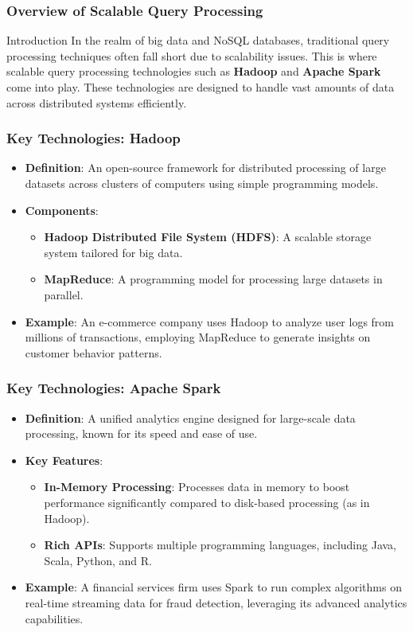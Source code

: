 \documentclass[aspectratio=169]{beamer}
\begin{document}
\begin{frame}[fragile]
    \frametitle{Overview of Scalable Query Processing}
    \begin{block}{Introduction}
        In the realm of big data and NoSQL databases, traditional query processing techniques often fall short due to scalability issues. This is where scalable query processing technologies such as \textbf{Hadoop} and \textbf{Apache Spark} come into play. These technologies are designed to handle vast amounts of data across distributed systems efficiently.
    \end{block}
\end{frame}

\begin{frame}[fragile]
    \frametitle{Key Technologies: Hadoop}
    \begin{itemize}
        \item \textbf{Definition}: An open-source framework for distributed processing of large datasets across clusters of computers using simple programming models.
        \item \textbf{Components}:
        \begin{itemize}
            \item \textbf{Hadoop Distributed File System (HDFS)}: A scalable storage system tailored for big data.
            \item \textbf{MapReduce}: A programming model for processing large datasets in parallel.
        \end{itemize}
        \item \textbf{Example}: An e-commerce company uses Hadoop to analyze user logs from millions of transactions, employing MapReduce to generate insights on customer behavior patterns.
    \end{itemize}
\end{frame}

\begin{frame}[fragile]
    \frametitle{Key Technologies: Apache Spark}
    \begin{itemize}
        \item \textbf{Definition}: A unified analytics engine designed for large-scale data processing, known for its speed and ease of use.
        \item \textbf{Key Features}:
        \begin{itemize}
            \item \textbf{In-Memory Processing}: Processes data in memory to boost performance significantly compared to disk-based processing (as in Hadoop).
            \item \textbf{Rich APIs}: Supports multiple programming languages, including Java, Scala, Python, and R.
        \end{itemize}
        \item \textbf{Example}: A financial services firm uses Spark to run complex algorithms on real-time streaming data for fraud detection, leveraging its advanced analytics capabilities.
    \end{itemize}
\end{frame}
\end{document}
